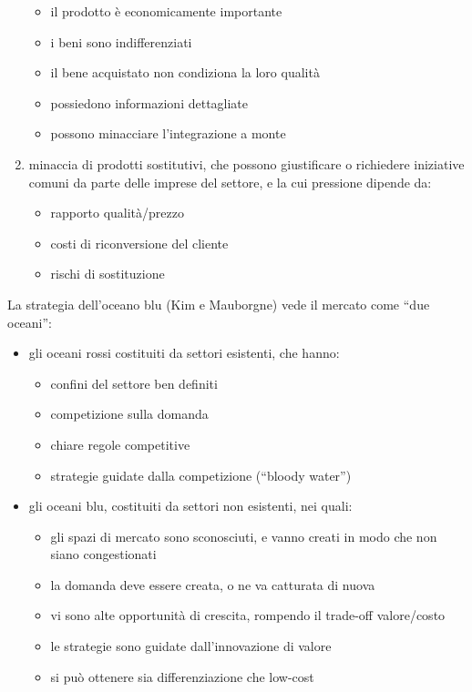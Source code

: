 \documentclass[answers, a4paper, 11pt]{exam}
\begin{document}
\begin{enumerate}
\begin{itemize}
        \item il prodotto è economicamente importante
        \item i beni sono indifferenziati
        \item il bene acquistato non condiziona la loro qualità
        \item possiedono informazioni dettagliate
        \item possono minacciare l'integrazione a monte
    \end{itemize}
    \item minaccia di prodotti sostitutivi, che possono giustificare o richiedere iniziative comuni da parte delle imprese del settore, e la cui pressione dipende da:
    \begin{itemize}
        \item rapporto qualità/prezzo
        \item costi di riconversione del cliente
        \item rischi di sostituzione
    \end{itemize}
\end{enumerate}

La strategia dell'oceano blu (Kim e Mauborgne) vede il mercato come ``due oceani'':
\begin{itemize}
    \item gli oceani rossi costituiti da settori esistenti, che hanno:
    \begin{itemize}
        \item confini del settore ben definiti
        \item competizione sulla domanda
        \item chiare regole competitive
        \item strategie guidate dalla competizione (``bloody water'')
    \end{itemize}
    \item gli oceani blu, costituiti da settori non esistenti, nei quali:
    \begin{itemize}
        \item gli spazi di mercato sono sconosciuti, e vanno creati in modo che non siano congestionati
        \item la domanda deve essere creata, o ne va catturata di nuova
        \item vi sono alte opportunità di crescita, rompendo il trade-off valore/costo
        \item le strategie sono guidate dall'innovazione di valore
        \item si può ottenere sia differenziazione che low-cost
    \end{itemize}
\end{itemize}
\end{document}

